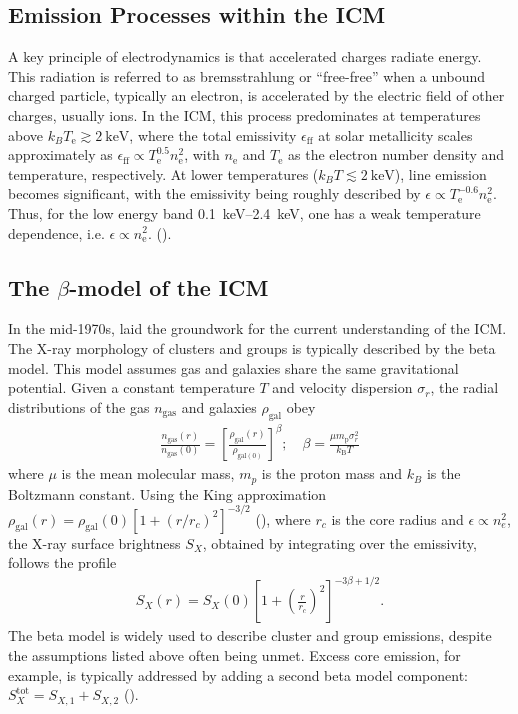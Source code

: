 \subsection{Emission Processes within the ICM}\label{subsec:emission}
A key principle of electrodynamics is that accelerated charges radiate energy. This radiation is referred to as bremsstrahlung or \enquote{free-free} when a unbound charged particle, typically an electron, is accelerated by the electric field of other charges, usually ions. In the ICM, this process predominates at temperatures above \(k_B T_\text{e} \gtrsim \SI{2}{\kilo\electronvolt}\), where the total emissivity \(\epsilon_{\text{ff}}\) at solar metallicity scales approximately as \(\epsilon_{\text{ff}} \propto T_\text{e}^{0.5} n_\text{e}^2\), 
with \(n_\text{e}\) and \(T_\text{e}\) as the electron number density and temperature, respectively. At lower temperatures (\(k_B T \lesssim \SI{2}{\kilo\electronvolt}\)), line emission becomes significant, with the emissivity being roughly described by \(\epsilon \propto T_\text{e}^{-0.6} n_\text{e}^2\).
Thus, for the low energy band \SIrange{0.1}{2.4}{\kilo\electronvolt}, one has a weak temperature dependence, i.e. \(\epsilon \propto n_\text{e}^2.\) (\cite{Reiprich2019}).
%
\subsection{The \(\beta\)-model of the ICM}\label{sec:beta_model}
In the mid-1970s, \citep{Cavaliere_1976} laid the groundwork for the current understanding of the ICM. The X-ray morphology of clusters and groups is typically described by the beta model. This model assumes gas and galaxies share the same gravitational potential. Given a constant temperature \(T\) and velocity dispersion \(\sigma_r\), the radial distributions of the gas \(n_{\text{gas}}\) and galaxies \(\rho_{\text{gal}}\) obey
\begin{align*}
    \frac{n_\text{gas}(r)}{n_{\text{gas}}(0)} = \left[\frac{\rho_{\text{gal}}(r)}{\rho_{\text{gal}(0)}}\right]^{\beta}; \quad \beta = \frac{\mu m_\text{p} \sigma_r^2}{k_\text{B}T}
\end{align*}
where \(\mu\) is the mean molecular mass, \(m_p\) is the proton mass and \(k_B\) is the Boltzmann constant. Using the King approximation \({\textstyle \rho_{\text{gal}}(r) = \rho_{\text{gal}}(0)[1 + (r/r_c)^2]^{-3/2}}\) (\cite{King1962}), where \(r_c\) is the core radius and \(\epsilon \propto n_e^2\), the X-ray surface brightness \(S_X\), obtained by integrating over the emissivity, follows the profile 
\begin{align*}
    S_X(r) = S_X(0)\left[1 + \left(\frac{r}{r_c}\right)^2\right]^{-3\beta + 1/2}.
\end{align*}
The beta model is widely used to describe cluster and group emissions, despite the assumptions listed above often being unmet. Excess core emission, for example, is typically addressed by adding a second beta model component: \(S_X^{\text{tot}} = S_{X,1} + S_{X,2}\) (\cite{Reiprich2019}).
%
